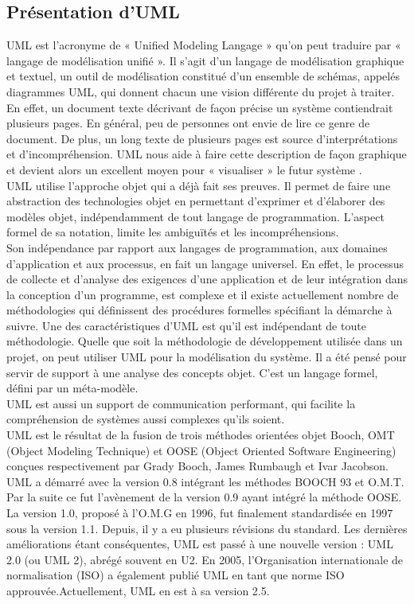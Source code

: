 \subsection{Présentation d'UML}
UML est l’acronyme de « Unified Modeling Langage »  qu'on peut traduire par « langage de modélisation unifié ». Il s'agit d'un langage de modélisation graphique et textuel, un outil de modélisation constitué d’un ensemble de schémas, appelés diagrammes UML, qui donnent chacun une vision différente du projet à traiter. En effet, un document texte décrivant de façon précise un système contiendrait plusieurs pages. En général, peu de personnes ont envie de lire ce genre de document. De plus, un long texte de plusieurs pages est source d’interprétations et d’incompréhension. UML nous aide à faire cette description de façon graphique et devient alors un excellent moyen pour « visualiser » le futur système \cite{uml1}.\\
UML utilise l'approche objet qui a déjà fait ses preuves. Il permet de faire une abstraction des technologies objet en permettant d’exprimer et d’élaborer des modèles objet, indépendamment de tout langage de programmation. L'aspect formel de sa notation, limite les ambiguïtés et les incompréhensions.\\
Son indépendance par rapport aux langages de programmation, aux domaines d'application et
aux processus, en fait un langage universel. En effet, le processus de collecte et d'analyse des exigences d'une application et de leur intégration dans la conception d'un programme, est complexe et il existe actuellement nombre de  méthodologies qui définissent des procédures formelles spécifiant la démarche à suivre. Une des caractéristiques d'UML est qu'il est indépendant de toute méthodologie. Quelle que soit la méthodologie de développement utilisée dans un projet, on peut utiliser UML pour la modélisation du système. Il a été pensé pour servir de support à une analyse des concepts objet. C’est un langage formel, défini par un méta-modèle.\\
UML est aussi un support de communication performant, qui facilite la compréhension de systèmes  aussi complexes qu'ils soient.\\
UML est le résultat de la fusion de trois méthodes orientées objet Booch, OMT (Object Modeling Technique) et OOSE (Object Oriented Software Engineering)   conçues respectivement par Grady Booch, James Rumbaugh et Ivar Jacobson. UML a démarré avec la version 0.8 intégrant les méthodes BOOCH 93 et O.M.T. Par la suite ce fut l'avènement de la version 0.9 ayant intégré la méthode OOSE. La version 1.0, proposé à l'O.M.G en 1996, fut finalement standardisée en 1997 sous la version 1.1. Depuis, il y a eu plusieurs révisions du standard. Les dernières améliorations étant conséquentes, UML est passé à une nouvelle version : UML 2.0 (ou UML 2), abrégé souvent en U2. En 2005, l'Organisation internationale de normalisation (ISO) a également publié UML en tant que norme ISO approuvée.Actuellement, UML en est à sa version 2.5.
